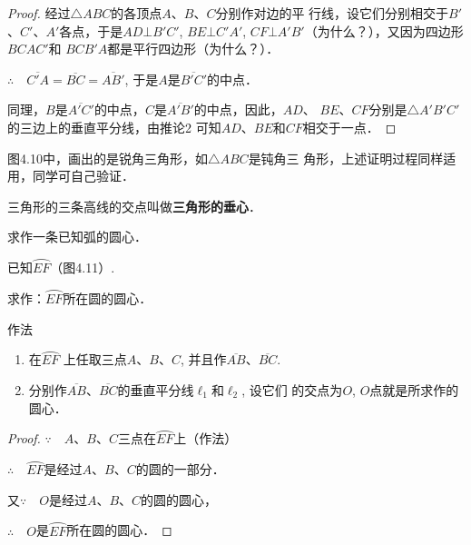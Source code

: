 \begin{proof}
    经过$\triangle ABC$的各顶点$A$、$B$、$C$分别作对边的平
行线，设它们分别相交于$B'$、$C'$、$A'$各点，于是$AD\bot B'C'$,
$BE\bot C'A'$, $CF\bot A'B'$（为什么？），又因为四边形$BCAC'$和
$BCB'A$都是平行四边形（为什么？）．

$\therefore\quad \overline{C'A}=\overline{BC}=\overline{AB'}$, 于是$A$是$\overline{B'C'}$的中点．

同理，$B$是$\overline{A'C'}$的中点，$C$是$\overline{A'B'}$的中点，因此，$AD$、
$BE$、$CF$分别是$\triangle A'B'C'$的三边上的垂直平分线，由推论2
可知$AD$、$BE$和$CF$相交于一点．
\end{proof}


图4.10中，画出的是锐角三角形，如$\triangle ABC$是钝角三
角形，上述证明过程同样适用，同学可自己验证．

三角形的三条高线的交点叫做\textbf{三角形的垂心}．

\begin{example}
    求作一条已知弧的圆心．
\end{example}

已知$\wideparen{EF}$（图4.11）.

求作：$\wideparen{EF}$所在圆的圆心．

作法
\begin{enumerate}
    \item 在$\wideparen{EF}$
    上任取三点$A$、$B$、$C$, 并且作$\overline{AB}$、$\overline{BC}$.
    \item 分别作$\overline{AB}$、$\overline{BC}$的垂直平分线$\ell_1$和$\ell_2$, 设它们
    的交点为$O$, $O$点就是所求作的圆心．
\end{enumerate}

\begin{proof}
    $\because\quad A$、$B$、$C$三点在$\wideparen{EF}$上（作法）

$\therefore\quad \wideparen{EF}$是经过$A$、$B$、$C$的圆的一部分．

又$\because\quad O$是经过$A$、$B$、$C$的圆的圆心，

$\therefore\quad O$是$\wideparen{EF}$所在圆的圆心．
\end{proof}

